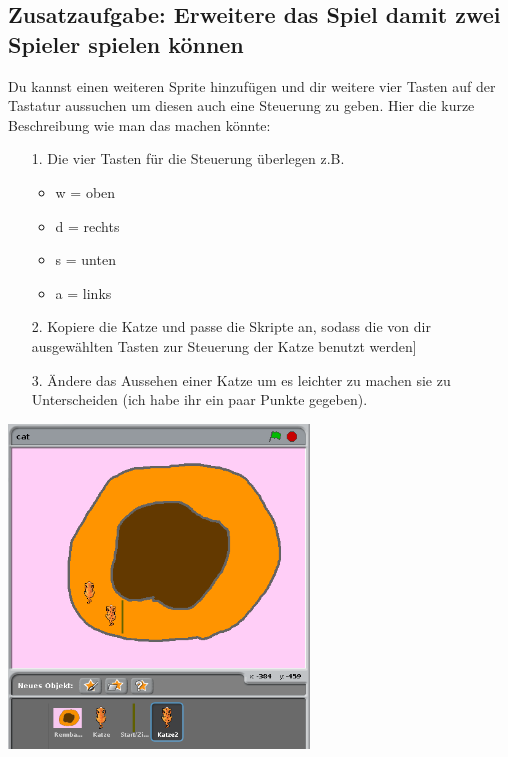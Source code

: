 \subsection{Zusatzaufgabe: Erweitere das Spiel damit zwei Spieler spielen k{\"o}nnen}
Du kannst einen weiteren Sprite hinzuf\"ugen und dir weitere vier Tasten auf der Tastatur aussuchen um diesen auch eine Steuerung zu geben. Hier die kurze Beschreibung wie man das machen k\"onnte:
\begin{itemize}
\item[1. ] Die vier Tasten f\"ur die Steuerung \"uberlegen z.B.
  \begin{itemize}
  \item w = oben
  \item d = rechts
  \item s = unten
  \item a = links
\end{itemize}
\item[2. ] Kopiere die Katze und passe die Skripte an, sodass die von dir ausgew\"ahlten Tasten zur Steuerung der Katze benutzt werden]
  \item[3. ] \"Andere das Aussehen einer Katze um es leichter zu machen sie zu Unterscheiden (ich habe ihr ein paar Punkte gegeben).
\end{itemize}
\includegraphics[width=0.6\textwidth]{images/aufgabe4_multiplayer.png}
